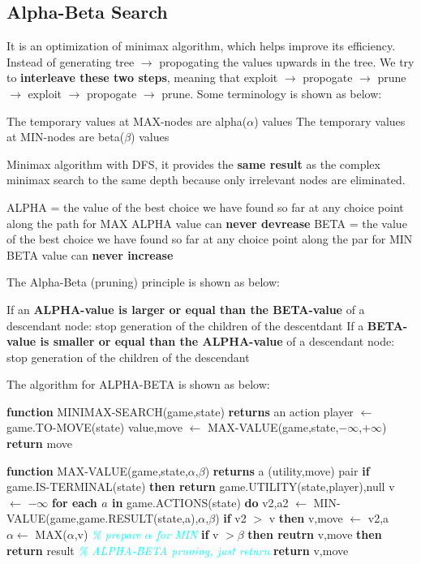 \subsection{Alpha-Beta Search}
It is an optimization of minimax algorithm, which helps improve its efficiency. Instead of generating tree $\rightarrow$ propogating the values upwards in the tree. We try to \textbf{interleave these two steps}, meaning that exploit $\rightarrow$ propogate $\rightarrow$ prune $\rightarrow$ exploit $\rightarrow$ propogate $\rightarrow$ prune. Some terminology is shown as below:
\begin{outline}
    \1 The temporary values at MAX-nodes are alpha($\alpha$) values
    \1 The temporary values at MIN-nodes are beta($\beta$) values
\end{outline}

\noindent
Minimax algorithm with DFS, it provides the \textbf{same result} as the complex minimax search to the same depth because only irrelevant nodes are eliminated.
\begin{outline}
    \1 ALPHA = the value of the best choice we have found so far at any choice point along the path for MAX
        \2 ALPHA value can \textbf{never devrease}
    \1 BETA = the value of the best choice we have found so far at any choice point along the par for MIN
        \2 BETA value can \textbf{never increase}
\end{outline}

\noindent
The Alpha-Beta (pruning) principle is shown as below:
\begin{outline}
    \1 If an \textbf{ALPHA-value is larger or equal than the BETA-value} of a descendant node: stop generation of the children of the descentdant
    \1 If a \textbf{BETA-value is smaller or equal than the ALPHA-value} of a descendant node: stop generation of the children of the descendant
\end{outline}

\noindent
The algorithm for ALPHA-BETA is shown as below:

\tabto{0mm} \textbf{function} MINIMAX-SEARCH(game,state) \textbf{returns} an action
\tabto{5mm} player $\leftarrow$ game.TO-MOVE(state)
\tabto{5mm} value,move $\leftarrow$ MAX-VALUE(game,state,$- \infty$,$+ \infty$)
\tabto{5mm} \textbf{return} move

\tabto{0mm} \textbf{function} MAX-VALUE(game,state,$\alpha$,$\beta$) \textbf{returns} a (utility,move) pair
\tabto{5mm} \textbf{if} game.IS-TERMINAL(state) \textbf{then return} game.UTILITY(state,player),null
\tabto{5mm} v $\leftarrow$ $- \infty$
\tabto{5mm} \textbf{for each $a$ in} game.ACTIONS(state) \textbf{do}
\tabto{10mm} v2,a2 $\leftarrow$ MIN-VALUE(game,game.RESULT(state,a),$\alpha$,$\beta$)
\tabto{10mm} \textbf{if} v2 $>$ v \textbf{then}
\tabto{15mm} v,move $\leftarrow$ v2,a
\tabto{15mm} $\alpha \leftarrow$ MAX($\alpha$,v) \textcolor{cyan}{\emph{\% prepare $\alpha$ for MIN}}
\tabto{10mm} \textbf{if} v $> \beta$ \textbf{then reutrn} v,move \textbf{then return} result \textcolor{cyan}{\emph{\% ALPHA-BETA pruning, just return}}
\tabto{5mm} \textbf{return} v,move

